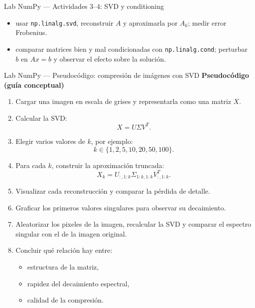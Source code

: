 \begin{frame}{Lab NumPy — Actividades 3--4: SVD y conditioning}
\begin{itemize}\small
  \item {} usar \texttt{np.linalg.svd}, reconstruir $A$ y aproximarla por $A_k$; medir error Frobenius.
  \item {} comparar matrices bien y mal condicionadas con \texttt{np.linalg.cond}; perturbar $b$ en $Ax=b$ y observar el efecto sobre la solución.
\end{itemize}
\end{frame}

\begin{frame}{Lab NumPy — Pseudocódigo: compresión de imágenes con SVD}
\footnotesize
\textbf{Pseudocódigo (guía conceptual)}
\begin{enumerate}\footnotesize
  \item Cargar una imagen en escala de grises y representarla como una matriz $X$.
  \item Calcular la SVD:
  \[
    X = U \Sigma V^T.
  \]
  \item Elegir varios valores de $k$, por ejemplo:
  \[
    k \in \{1, 2, 5, 10, 20, 50, 100\}.
  \]
  \item Para cada $k$, construir la aproximación truncada:
  \[
    X_k = U_{:,1:k} \Sigma_{1:k,1:k} V_{:,1:k}^T.
  \]
  \item Visualizar cada reconstrucción y comparar la pérdida de detalle.
  \item Graficar los primeros valores singulares para observar su decaimiento.
  \item Aleatorizar los pixeles de la imagen, recalcular la SVD y comparar el espectro singular con el de la imagen original.
  \item Concluir qué relación hay entre:
  \begin{itemize}\scriptsize
    \item estructura de la matriz,
    \item rapidez del decaimiento espectral,
    \item calidad de la compresión.
  \end{itemize}
\end{enumerate}
\end{frame}

